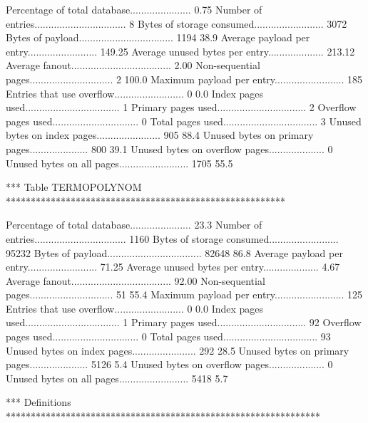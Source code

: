 Percentage of total database......................   0.75%
Number of entries................................. 8         
Bytes of storage consumed......................... 3072      
Bytes of payload.................................. 1194        38.9%
Average payload per entry......................... 149.25    
Average unused bytes per entry.................... 213.12    
Average fanout.................................... 2.00      
Non-sequential pages.............................. 2          100.0%
Maximum payload per entry......................... 185       
Entries that use overflow......................... 0            0.0%
Index pages used.................................. 1         
Primary pages used................................ 2         
Overflow pages used............................... 0         
Total pages used.................................. 3         
Unused bytes on index pages....................... 905         88.4%
Unused bytes on primary pages..................... 800         39.1%
Unused bytes on overflow pages.................... 0         
Unused bytes on all pages......................... 1705        55.5%

*** Table TERMOPOLYNOM ********************************************************

Percentage of total database......................  23.3%
Number of entries................................. 1160      
Bytes of storage consumed......................... 95232     
Bytes of payload.................................. 82648       86.8%
Average payload per entry......................... 71.25     
Average unused bytes per entry.................... 4.67      
Average fanout.................................... 92.00     
Non-sequential pages.............................. 51          55.4%
Maximum payload per entry......................... 125       
Entries that use overflow......................... 0            0.0%
Index pages used.................................. 1         
Primary pages used................................ 92        
Overflow pages used............................... 0         
Total pages used.................................. 93        
Unused bytes on index pages....................... 292         28.5%
Unused bytes on primary pages..................... 5126         5.4%
Unused bytes on overflow pages.................... 0         
Unused bytes on all pages......................... 5418         5.7%

*** Definitions ***************************************************************

